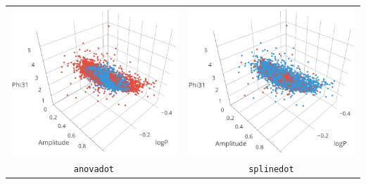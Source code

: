 \begin{longtable}{ c c }
	\includegraphics[width=0.3\paperwidth]{images/ksvm_anovadot.png} & \includegraphics[width=0.3\paperwidth]{images/ksvm_splinedot.png} \\
	\verb|anovadot| & \verb|splinedot| \\
\end{longtable}

